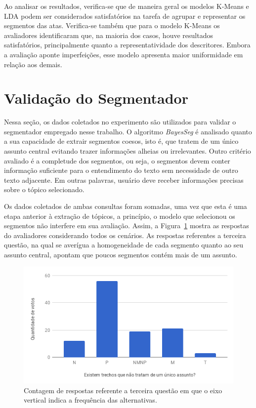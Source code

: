 Ao analisar os resultados, verifica-se que de maneira geral os modelos K-Means e LDA podem ser considerados satisfatórios na tarefa de agrupar e representar os segmentos das atas.
Verifica-se também que para o modelo K-Means os avaliadores identificaram que, na maioria dos casos, houve resultados satisfatórios, principalmente quanto a representatividade dos descritores. Embora a avaliação aponte imperfeições, esse modelo apresenta maior uniformidade em relação aos demais.

\section{Validação do Segmentador}

Nessa seção, os dados coletados no experimento são utilizados para validar o segmentador empregado nesse trabalho. O algoritmo \textit{BayesSeg} é analisado quanto a sua capacidade de extrair segmentos coesos, isto é, que tratem de um único assunto central evitando trazer informações alheias ou irrelevantes. Outro critério avaliado é a completude dos segmentos, ou seja, o segmentos devem conter informação suficiente para o entendimento do texto sem necessidade de outro texto adjacente. Em outras palavras, usuário deve receber informações precisas sobre o tópico selecionado.

Os dados coletados de ambas consultas foram somadas, uma vez que esta é uma etapa anterior à extração de tópicos, a princípio, o modelo que selecionou os segmentos não interfere em sua avaliação. Assim, a Figura~\ref{fig:Q3} mostra as respostas do avaliadores considerando todos os cenários. As respostas referentes a terceira questão, na qual se averígua a homogeneidade de cada segmento quanto ao seu assunto central, apontam que poucos segmentos contém mais de um assunto.

\begin{figure}[!h] \centering     %

		\includegraphics[width=.48\textwidth]{conteudo/capitulos/figs/figuras-experimento/Q3-Seg.png}
	\caption{Contagem de respostas referente a terceira questão em que o eixo vertical indica a frequência das alternativas.  }
	\label{fig:Q3}
\end{figure}


